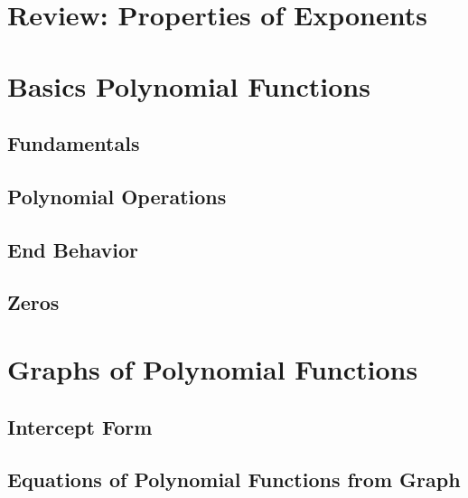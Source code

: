 \documentclass[]{book}
\begin{document}
\hypertarget{review-properties-of-exponents}{%
\section{Review: Properties of Exponents}\label{review-properties-of-exponents}}

\hypertarget{basics-polynomial-functions}{%
\section{Basics Polynomial Functions}\label{basics-polynomial-functions}}

\hypertarget{fundamentals}{%
\subsection{Fundamentals}\label{fundamentals}}

\hypertarget{polynomial-operations}{%
\subsection{Polynomial Operations}\label{polynomial-operations}}

\hypertarget{end-behavior}{%
\subsection{End Behavior}\label{end-behavior}}

\hypertarget{zeros}{%
\subsection{Zeros}\label{zeros}}

\hypertarget{graphs-of-polynomial-functions}{%
\section{Graphs of Polynomial Functions}\label{graphs-of-polynomial-functions}}

\hypertarget{intercept-form}{%
\subsection{Intercept Form}\label{intercept-form}}

\hypertarget{equations-of-polynomial-functions-from-graph}{%
\subsection{Equations of Polynomial Functions from Graph}\label{equations-of-polynomial-functions-from-graph}}
\end{document}
